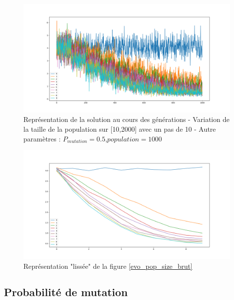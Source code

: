 \documentclass[12pt]{report}
\begin{document}
      \begin{figure}[h]
        \centering
        \includegraphics[width=15cm]{img/evo_crossover_brut.png}
        \caption{Représentation de la solution au cours des générations - Variation de la taille de la population sur [10,2000] avec un pas de 10 - Autre paramètres : $P_{mutation} = 0.5$,$population = 1000$}
        \label{evo_crossover_brut}
      \end{figure}

      \begin{figure}[!]
        \centering
        \includegraphics[width=15cm]{img/evo_crossover_moy.png}
        \caption{Représentation "lissée" de la figure \ref{evo_pop_size_brut}}
        \label{evo_crossover_moy}
      \end{figure}

      \subsection{Probabilité de mutation}
\end{document}
